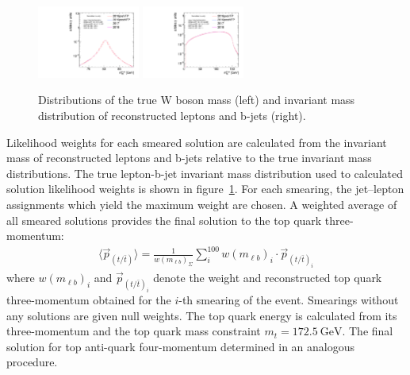 \begin{figure}[htb]
    \begin{center}
        \includegraphics[width=0.30\textwidth]{fig_fullRun2UL/SmearingPlots/ULcomp_KinReco_W_mass_step0.pdf}
        \includegraphics[width=0.30\textwidth]{fig_fullRun2UL/SmearingPlots/ULcomp_KinReco_mbl_true_step0.pdf}
        \caption{\small Distributions of the true W boson mass (left) and invariant mass distribution of reconstructed leptons and b-jets (right).}
       \label{fig:inputDists}
    \end{center}
\end{figure}

Likelihood weights for each smeared solution are calculated from the invariant mass of reconstructed leptons and b-jets relative to the true invariant mass distributions.
The true lepton-b-jet invariant mass distribution used to calculated solution likelihood weights is shown in figure~\ref{fig:inputDists}.
For each smearing, the jet--lepton assignments which yield the maximum weight are chosen.
A weighted average of all smeared solutions provides the final solution to the top quark three-momentum:
\begin{align}
\langle \vec{p}_{(t / \bar{t})} \rangle = \frac{1}{w(m_{\ell b})_{\Sigma}} \sum_i^{100} w(m_{\ell b})_i \cdot \vec{p}_{(t / \bar{t})_i}
\end{align}
where $w(m_{\ell b})_i$ and $\vec{p}_{{(t / \bar{t})}_i}$ denote the weight and reconstructed top quark three-momentum obtained for the $i$-th smearing of the event.
Smearings without any solutions are given null weights.
The top quark energy is calculated from its three-momentum and the top quark mass constraint $m_{t} = \SI{172.5}{\GeV}$.
The final solution for top anti-quark four-momentum determined in an analogous procedure.


